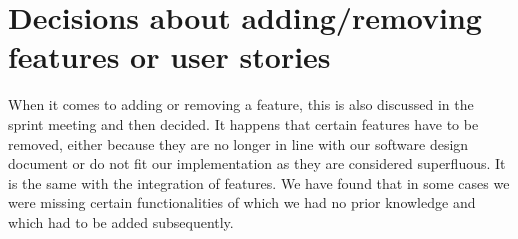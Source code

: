 \documentclass[12pt]{article}
\begin{document}
\section{Decisions about adding/removing features or user stories}
When it comes to adding or removing a feature, this is also discussed in the sprint meeting and then decided. It happens that certain features have to be removed, either because they are no longer in line with our software design document or do not fit our implementation as they are considered superfluous. It is the same with the integration of features. We have found that in some cases we were missing certain functionalities of which we had no prior knowledge and which had to be added subsequently.
\end{document}
